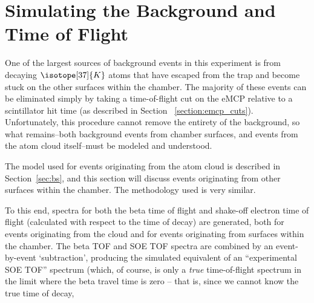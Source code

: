 




\section{Simulating the Background and Time of Flight}
\label{sec:tof_bg}
One of the largest sources of background events in this experiment is from decaying $\isotope[37]{K}$ atoms that have escaped from the trap and become stuck on the other surfaces within the chamber.  The majority of these events can be eliminated simply by taking a time-of-flight cut on the eMCP relative to a scintillator hit time (as described in Section ~\ref{section:emcp_cuts}).  Unfortunately, this procedure cannot remove the entirety of the background, so what remains--both background events from chamber surfaces, and events from the atom cloud itself--must be modeled and understood.  

The model used for events originating from the atom cloud is described in Section~\ref{sec:bs}, and this section will discuss events originating from other surfaces within the chamber.  The methodology used is very similar.  

To this end, spectra for both the beta time of flight and shake-off electron time of flight (calculated with respect to the time of decay) are generated, both for events originating from the cloud and for events originating from surfaces within the chamber.  The beta TOF and SOE TOF spectra are combined by an event-by-event `subtraction', producing the simulated equivalent of an ``experimental SOE TOF'' spectrum (which, of course, is only a \emph{true} time-of-flight spectrum in the limit where the beta travel time is zero -- that is, since we cannot know the true time of decay, 

